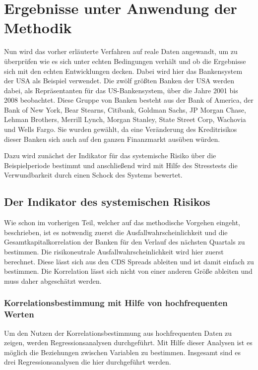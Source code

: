 \documentclass[a4paper,12pt]{scrartcl}
\begin{document}
\section{Ergebnisse unter Anwendung der Methodik}
Nun wird das vorher erläuterte Verfahren auf reale Daten angewandt, um zu überprüfen wie es sich unter echten Bedingungen verhält und ob die Ergebnisse sich mit den echten Entwicklungen decken. Dabei wird hier das Bankensystem der USA als Beispiel verwendet. Die zwölf größten Banken der USA werden dabei, als Repräsentanten für das US-Bankensystem, über die Jahre 2001 bis 2008 beobachtet. Diese Gruppe von Banken besteht aus der Bank of America, der Bank of New York, Bear Stearns, Citibank, Goldman Sachs, JP Morgan Chase, Lehman Brothers, Merrill Lynch, Morgan Stanley, State Street Corp, Wachovia und Wells Fargo. Sie wurden gewählt, da eine Veränderung des Kreditrisikos dieser Banken sich auch auf den ganzen Finanzmarkt ausüben würden.

Dazu wird zunächst der Indikator für das systemische Risiko über die Beispielperiode bestimmt und anschließend wird mit Hilfe des Stresstests die Verwundbarkeit durch einen Schock des Systems bewertet.

\subsection{Der Indikator des systemischen Risikos}
Wie schon im vorherigen Teil, welcher auf das methodische Vorgehen eingeht, beschrieben, ist es notwendig zuerst die Ausfallwahrscheinlichkeit und die Gesamtkapitalkorrelation der Banken für den Verlauf des nächsten Quartals zu bestimmen.
Die risikoneutrale Ausfallwahrscheinlichkeit wird hier zuerst berechnet. Diese lässt sich aus den CDS Spreads ableiten und ist damit einfach zu bestimmen.
Die Korrelation lässt sich nicht von einer anderen Größe ableiten und muss daher abgeschätzt werden.


\subsubsection{Korrelationsbestimmung mit Hilfe von hochfrequenten Werten}
Um den Nutzen der Korrelationsbestimmung aus hochfrequenten Daten zu zeigen,  werden Regressionsanalysen durchgeführt. Mit Hilfe dieser Analysen ist es möglich die Beziehungen zwischen Variablen zu bestimmen.
Insgesamt sind es drei Regressionsanalysen die hier durchgeführt werden.
\end{document}
